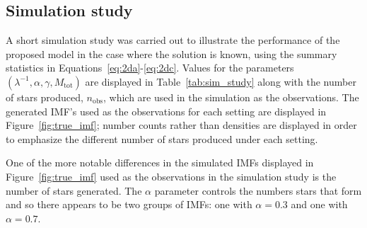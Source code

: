 \documentclass[ejs]{imsart}
\numberwithin{equation}{section}
\theoremstyle{plain}
\newcommand{\nobs}{n_{\text{obs}}}
\newcommand{\Mtot}{M_{\text{tot}}}
\begin{document}
\subsection{Simulation study}
A short simulation study was carried out to illustrate the performance of the proposed model in the case where the solution is known, using the summary statistics in Equations~\eqref{eq:2da}-\eqref{eq:2dc}.  Values for the parameters $(\lambda^{-1}, \alpha, \gamma, \Mtot)$ are displayed in Table~\ref{tab:sim_study} along with the number of stars produced, $\nobs$, which are used in the simulation as the observations.  The generated IMF's used as the observations for each setting are displayed in Figure~\ref{fig:true_imf}; number counts rather than densities are displayed in order to emphasize the different number of stars produced under each setting.


One of the more notable differences in the simulated IMFs displayed in Figure~\ref{fig:true_imf} used as the observations in the simulation study is the number of stars generated.  The $\alpha$ parameter controls the numbers stars that form and so there appears to be two groups of IMFs:  one with $\alpha = 0.3$ and one with $\alpha = 0.7$.  
\end{document}
